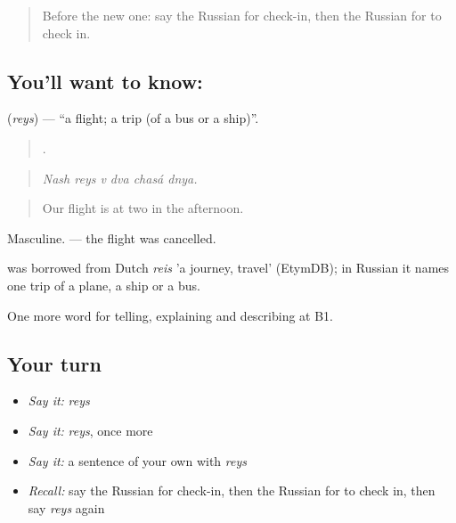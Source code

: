 \label{lesson:RU-C419-reys}



\begin{quote}
Before the new one: say the Russian for check-in, then the Russian for to check in.
\end{quote}

\subsection*{You'll want to know: }
\textbf{} (\emph{reys}) — \textquotedblleft{}a flight; a trip (of a bus or a ship)\textquotedblright{}.

\begin{quote}
     .
\end{quote}

\begin{quote}
\emph{Nash reys v dva chasá dnya.}
\end{quote}

\begin{quote}
Our flight is at two in the afternoon.
\end{quote}

Masculine. \emph{ } — the flight was cancelled.

\begin{cousinweb}
\emph{} was borrowed from Dutch \emph{reis} 'a journey, travel' (EtymDB); in Russian it names one trip of a plane, a ship or a bus.
\end{cousinweb}

\begin{grammarlens}[title={What you've built}]
One more word for telling, explaining and describing at B1.
\end{grammarlens}

\subsection*{Your turn}
\begin{itemize}
\raggedright
  \item \emph{Say it:} \emph{reys}
  \item \emph{Say it:} \emph{reys}, once more
  \item \emph{Say it:} a sentence of your own with \emph{reys}
  \item \emph{Recall:} say the Russian for check-in, then the Russian for to check in, then say \emph{reys} again
\end{itemize}

